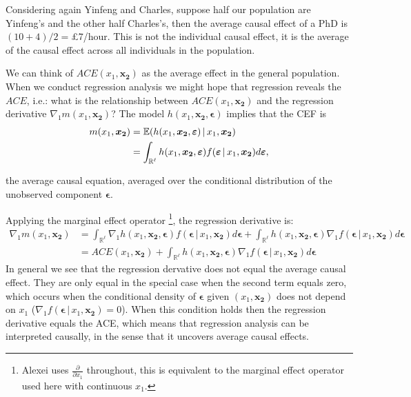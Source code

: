 \documentclass[DIV=14,titlepage=false]{scrreprt}
\begin{document}
\begin{example}
Considering again Yinfeng and Charles, suppose half our population are Yinfeng's and the other half Charles's, then the average causal effect of a PhD is $(10+4)/2=$£$7$/hour. This is not the individual causal effect, it is the average of the causal effect across all individuals in the population.
\end{example}
We can think of $ACE(x_1, \mathbf{x_2})$ as the average effect in the general population. When we conduct regression analysis we might hope that regression reveals the $ACE$, i.e.: what is the relationship between $ACE(x_1, \mathbf{x_2})$ and the regression derivative $\nabla_1 m(x_1, \mathbf{x_2})$? The model $h(x_1, \mathbf{x_2},\boldsymbol{\epsilon})$ implies that the CEF is
\begin{align*}
m(x_1, \boldsymbol{x_2}) &= \mathbb{E}(h(x_1, \boldsymbol{x_2}, \boldsymbol{\varepsilon}) \, | \, x_1, \boldsymbol{x_2})\\
&= \int_{\mathbb{R}^{\ell}} h(x_1, \boldsymbol{x_2}, \boldsymbol{\varepsilon}) f(\boldsymbol{\varepsilon} \, | \, x_1, \boldsymbol{x_2}) d\boldsymbol{\varepsilon},
\end{align*}

the average causal equation, averaged over the conditional distribution of the unobserved component $\boldsymbol{\epsilon}$. 

Applying the marginal effect operator \footnote[1]{Alexei uses $\frac{\partial}{\partial x_1}$ throughout, this is equivalent to the marginal effect operator used here with continuous $x_1$.}, the regression derivative is:
\begin{align*}
\nabla_1 m(x_1, \boldsymbol{x_2}) &= \int_{\mathbb{R}^{\ell}} \nabla_1 h(x_1, \boldsymbol{x_2}, \boldsymbol{\epsilon}) f(\boldsymbol{\epsilon} \, | \, x_1, \boldsymbol{x_2}) d\boldsymbol{\epsilon} + \int_{\mathbb{R}^{\ell}} h(x_1, \boldsymbol{x_2}, \boldsymbol{\epsilon}) \nabla_1 f(\boldsymbol{\epsilon} \, | \, x_1, \boldsymbol{x_2}) d\boldsymbol{\epsilon}\\
&= ACE(x_1, \boldsymbol{x_2}) + \int_{\mathbb{R}^{\ell}} h(x_1, \boldsymbol{x_2}, \boldsymbol{\epsilon}) \nabla_1 f(\boldsymbol{\epsilon} \, | \, x_1, \boldsymbol{x_2}) d\boldsymbol{\epsilon}
\end{align*}
In general we see that the regression dervative does not equal the average causal effect. They are only equal in the special case when the second term equals zero, which occurs when the conditional density of $\boldsymbol{\epsilon}$ given $( x_1, \boldsymbol{x_2})$ does not depend on $x_1$ ($\nabla_1 f(\boldsymbol{\epsilon} \, | \, x_1, \boldsymbol{x_2})=0$). When this condition holds then the regression derivative equals the ACE, which means that regression analysis can be interpreted causally, in the sense that it uncovers average causal effects.\\
\end{document}
